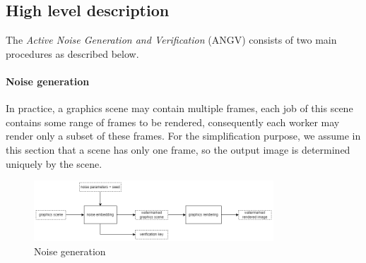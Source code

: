 
\subsection[Hight level description]{High level description}
The \emph{Active Noise Generation and Verification} (ANGV) consists of two main procedures as described below.

\paragraph[Watermark insertion]{Noise generation}
In practice, a graphics scene may contain multiple frames, each job of this scene contains some range of frames to be rendered, consequently each worker may render only a subset of these frames. For the simplification purpose, we assume in this section that a scene has only one frame, so the output image is determined uniquely by the scene.
\begin{figure}[h]
    \centering
    \includegraphics[width=0.8\textwidth]{noise_generation.png}
    \caption[Noise generation]{Noise generation}
    \label{fig:noise_generation}
\end{figure}


